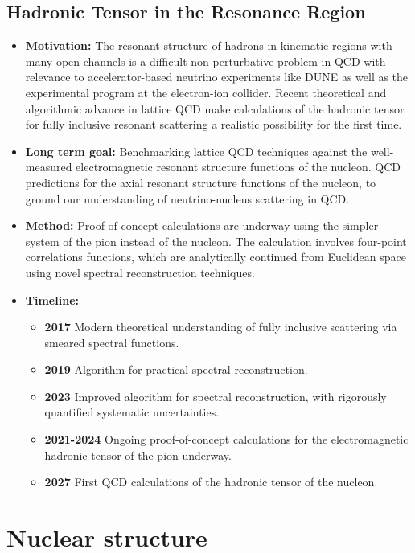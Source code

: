 \documentclass[12pt,hyperpdf]{article}
\begin{document}
\subsection{Hadronic Tensor in the Resonance Region}
\begin{itemize}
    \item{\bf Motivation:} The resonant structure of hadrons in kinematic regions with many open channels is a difficult non-perturbative problem in QCD with relevance to accelerator-based neutrino experiments like DUNE as well as the experimental program at the electron-ion collider.
    Recent theoretical and algorithmic advance in lattice QCD make calculations of the hadronic tensor for fully inclusive resonant scattering a realistic possibility for the first time.
    \item{\bf Long term goal:}
    Benchmarking lattice QCD techniques against the well-measured electromagnetic resonant structure functions of the nucleon.
    QCD predictions for the axial resonant structure functions of the nucleon, to ground our understanding of neutrino-nucleus scattering in QCD.
    \item{\bf Method:} Proof-of-concept calculations are underway using the simpler system of the pion instead of the nucleon.
	The calculation involves four-point correlations functions, which are analytically continued from Euclidean space using novel spectral reconstruction techniques.
\item{\bf Timeline:}
\begin{itemize}
    \item{\bf 2017} Modern theoretical understanding of fully inclusive scattering via smeared spectral functions.~\cite{Hansen:2017mnd}
    \item{\bf 2019} Algorithm for practical spectral reconstruction.~\cite{Hansen:2019idp}
    \item{\bf 2023} Improved algorithm for spectral reconstruction, with rigorously quantified systematic uncertainties.
    \item{\bf 2021-2024} Ongoing proof-of-concept calculations for the electromagnetic hadronic tensor of the pion underway.
    \item{\bf 2027} First QCD calculations of the hadronic tensor of the nucleon.
\end{itemize}
\end{itemize}

\section{Nuclear structure}\label{sec:nucstruct}
\end{document}
